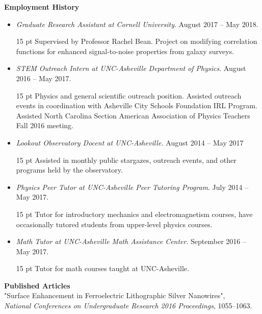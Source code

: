 \documentclass[a4paper, 11pt]{article}
\newcommand{\noi}{\noindent}
\newcommand{\ind}{\indent}
\newenvironment{pari}{\begin{adjustwidth}{15 pt}{}}{\end{adjustwidth}}
\begin{document}
\noi \textbf{Employment History}
\begin{itemize}[leftmargin=*]
	\item \noi \emph{Graduate Research Assistant at Cornell University}. August 2017 -- May 2018.
	\begin{pari}
		Supervised by Professor Rachel Bean. Project on modifying correlation functions for enhanced signal-to-noise properties from galaxy surveys.
	\end{pari}

	\item \noi \emph{STEM Outreach Intern at UNC-Asheville Department of Physics}. August 2016 -- May 2017.
	\begin{pari}
		Physics and general scientific outreach position. Assisted outreach events in coordination with Asheville City Schools Foundation IRL Program. Assisted North Carolina Section American Association of Physics Teachers Fall 2016 meeting.
	\end{pari}

	\item \noi \emph{Lookout Observatory Docent at UNC-Asheville.} August 2014 -- May 2017
		\begin{pari}
			\noi Assisted in monthly public stargazes, outreach events, and other programs held by the observatory.
		\end{pari}

	\item \noi \emph{Physics Peer Tutor at UNC-Asheville Peer Tutoring Program}. July 2014 -- May 2017.
	\begin{pari}
	\noi Tutor for introductory mechanics and electromagnetism courses, have occasionally tutored students from upper-level physics courses.
	\end{pari}

	\item \noi \emph{Math Tutor at UNC-Asheville Math Assistance Center}.  September 2016 -- May 2017.
	\begin{pari}
		\noi Tutor for math courses taught at UNC-Asheville. 
	\end{pari}
\end{itemize}

\newpage

\noi \textbf{Published Articles}
\\

\noi "Surface Enhancement in Ferroelectric Lithographic Silver Nanowires", 
\\
	\ind \emph{National Conferences on Undergraduate Research 2016 Proceedings}, 1055--1063.
\\
\end{document}
